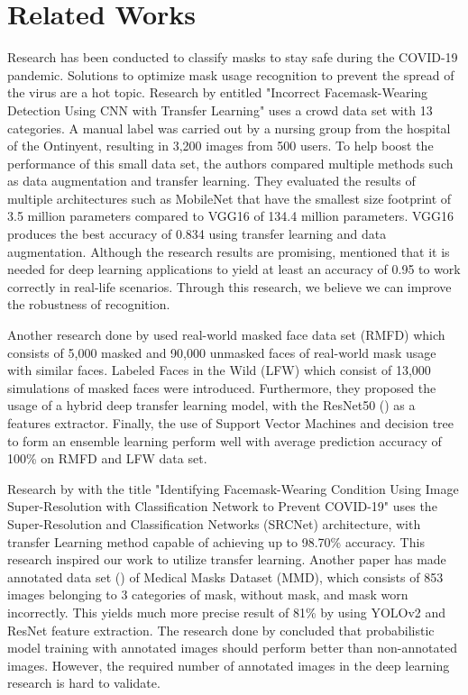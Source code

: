 \documentclass{article}
\begin{document}
\section{Related Works}\label{related_works}
Research has been conducted to classify masks to stay safe during the COVID-19 pandemic. Solutions to optimize mask usage recognition to prevent the spread of the virus are a hot topic. Research by \cite{Tomas2021} entitled "Incorrect Facemask-Wearing Detection Using CNN with Transfer Learning" uses a crowd data set with 13 categories. A manual label was carried out by a nursing group from the hospital of the Ontinyent, resulting in 3,200 images from 500 users. To help boost the performance of this small data set, the authors compared multiple methods such as data augmentation and transfer learning. They evaluated the results of multiple architectures such as MobileNet \citep{howard2017mobilenets} that have the smallest size footprint of 3.5 million parameters compared to VGG16 \citep{simonyan15vgg} of 134.4 million parameters. VGG16 produces the best accuracy of 0.834 using transfer learning and data augmentation. Although the research results are promising,  \cite{Sarker2021realworldapplications} mentioned that it is needed for deep learning applications to yield at least an accuracy of 0.95 to work correctly in real-life scenarios. Through this research, we believe we can improve the robustness of recognition.

Another research done by \cite{Loey2021maskdetection} used real-world masked face data set (RMFD) \citep{wang2020RMFD} which consists of 5,000 masked and 90,000 unmasked faces of real-world mask usage with similar faces. Labeled Faces in the Wild (LFW) \citep{kawulok2016advances} which consist of 13,000 simulations of masked faces were introduced. Furthermore, they proposed the usage of a hybrid deep transfer learning model, with the ResNet50 (\cite{he2015resnet}) as a features extractor. Finally, the use of Support Vector Machines \citep{Cristianini2008svm} and decision tree \citep{breiman1984decisiiontree} to form an ensemble learning \citep{zhang2012ensemble} perform well with average prediction accuracy of 100\% on RMFD and LFW data set.

Research by \cite{Bosheng2020} with the title "Identifying Facemask-Wearing Condition Using Image Super-Resolution with Classification Network to Prevent COVID-19" uses the Super-Resolution and Classification Networks (SRCNet) architecture, with transfer Learning method capable of achieving up to 98.70\% accuracy. This research inspired our work to utilize transfer learning. Another paper has made annotated data set (\cite{Loey2021NovelDeep}) of Medical Masks Dataset (MMD), which consists of 853 images belonging to 3 categories of mask, without mask, and mask worn incorrectly. This yields much more precise result of 81\% by using YOLOv2 \citep{redmon2015yolo} and ResNet \citep{he2015resnet} feature extraction. The research done by \cite{Li2012annotated} concluded that probabilistic model training with annotated images should perform better than non-annotated images. However, the required number of annotated images in the deep learning research is hard to validate.
\end{document}
